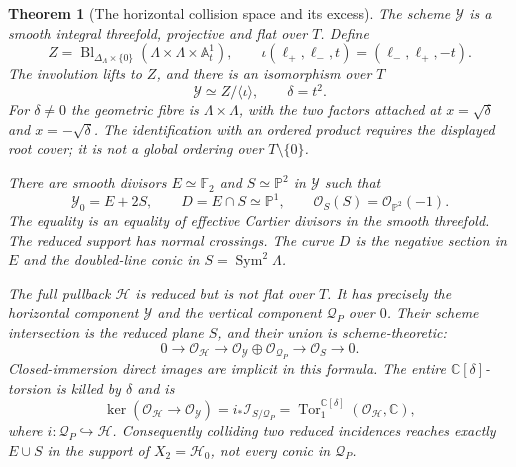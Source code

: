 \documentclass[11pt,reqno]{amsart}
\numberwithin{equation}{section}
\newtheorem{theorem}{Theorem}[section]
\theoremstyle{definition}\newtheorem{definition}[theorem]{Definition}
\theoremstyle{remark}\newtheorem{remark}[theorem]{Remark}
\newcommand{\C}{\mathbb C}\newcommand{\Q}{\mathbb Q}
\newcommand{\Pj}{\mathbb P}\newcommand{\A}{\mathbb A}
\newcommand{\OO}{\mathcal O}\newcommand{\II}{\mathcal I}
\begin{document}
\begin{theorem}[The horizontal collision space and its excess]
\label{thm:collision-family-v164}
The scheme $\mathcal Y$ is a smooth integral threefold, projective
and flat over $T$. Define
\begin{equation}\label{eq:ordered-blowup-v164}
 Z=\operatorname{Bl}_{\Delta_\Lambda\times\{0\}}
           (\Lambda\times\Lambda\times\mathbb A^1_t),\qquad
 \iota(\ell_+,\ell_-,t)=(\ell_-,\ell_+,-t).
\end{equation}
The involution lifts to $Z$, and there is an isomorphism over $T$
\begin{equation}\label{eq:quotient-model-v164}
             \mathcal Y\simeq Z/\langle\iota\rangle,
                         \qquad \delta=t^2.
\end{equation}
For $\delta\ne0$ the geometric fibre is $\Lambda\times\Lambda$,
with the two factors attached at $x=\sqrt\delta$ and $x=-\sqrt\delta$.
The identification with an ordered product requires the displayed
root cover; it is not a global ordering over $T\setminus\{0\}$.

There are smooth divisors $E\simeq\mathbb F_2$ and $S\simeq\Pj^2$
in $\mathcal Y$ such that
\begin{equation}\label{eq:horizontal-special-v164}
       \mathcal Y_0=E+2S,\qquad
       D=E\cap S\simeq\Pj^1,\qquad
       \OO_S(S)=\OO_{\Pj^2}(-1).
\end{equation}
The equality is an equality of effective Cartier divisors in the
smooth threefold. The reduced support has normal crossings.
The curve $D$ is the negative section in $E$ and the doubled-line
conic in $S=\operatorname{Sym}^2\Lambda$.

The full pullback $\mathcal H$ is reduced but is not flat over $T$.
It has precisely the horizontal component $\mathcal Y$ and the
vertical component $\mathcal Q_P$ over $0$. Their scheme intersection
is the reduced plane $S$, and their union is scheme-theoretic:
\begin{equation}\label{eq:collision-union-v164}
 0\longrightarrow\OO_{\mathcal H}\longrightarrow
 \OO_{\mathcal Y}\oplus\OO_{\mathcal Q_P}
 \longrightarrow\OO_S\longrightarrow0.
\end{equation}
Closed-immersion direct images are implicit in this formula. The
entire $\C[\delta]$-torsion is killed by $\delta$ and is
\begin{equation}\label{eq:collision-torsion-v164}
 \ker(\OO_{\mathcal H}\longrightarrow\OO_{\mathcal Y})
  =i_*\mathcal I_{S/\mathcal Q_P}
  =\operatorname{Tor}^{\C[\delta]}_1(\OO_{\mathcal H},\C),
\end{equation}
where $i:\mathcal Q_P\hookrightarrow\mathcal H$.
Consequently colliding two reduced incidences reaches exactly
$E\cup S$ in the support of $X_2=\mathcal H_0$, not every conic
in $\mathcal Q_P$.
\end{theorem}
\end{document}
